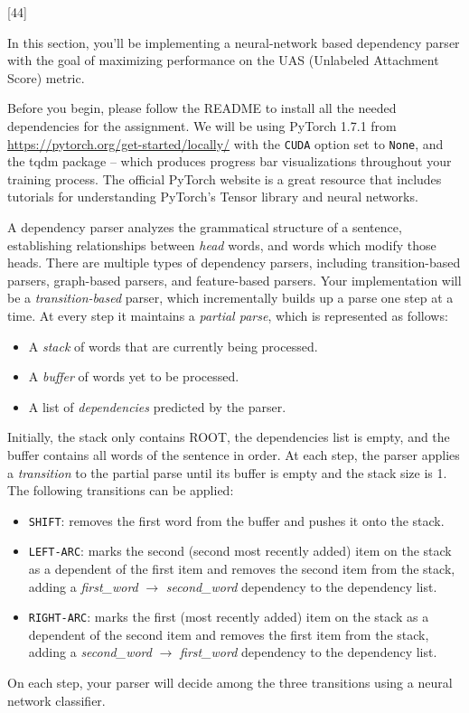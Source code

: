 [44]

In this section, you'll be implementing a neural-network based dependency parser with the goal of maximizing performance on the UAS (Unlabeled Attachment Score) metric.\newline

Before you begin, please follow the README to install all the needed dependencies for the assignment. We will be using PyTorch 1.7.1 from \url{https://pytorch.org/get-started/locally/} with the \texttt{CUDA} option set to \texttt{None}, and the tqdm package -- which produces progress bar visualizations throughout your training process. The official PyTorch website is a great resource that includes tutorials for understanding PyTorch's Tensor library and neural networks. \newline

A dependency parser analyzes the grammatical structure of a sentence, establishing relationships between \textit{head} words, and words which modify those heads. There are multiple types of dependency parsers, including transition-based parsers, graph-based parsers, and feature-based parsers. Your implementation will be a {\it transition-based} parser, which incrementally builds up a parse one step at a time. At every step it maintains a \textit{partial parse}, which is represented as follows:
\begin{itemize}
\item A {\it stack} of words that are currently being processed.
\item A {\it buffer} of words yet to be processed.
\item A list of {\it dependencies} predicted by the parser.
\end{itemize}
Initially, the stack only contains ROOT, the dependencies list is empty, and the buffer contains all words of the sentence in order. At each step, the parser applies a {\it transition} to the partial parse until its buffer is empty and the stack size is 1. The following transitions can be applied:
\begin{itemize}
\item \texttt{SHIFT}: removes the first word from the buffer and pushes it onto the stack.
\item \texttt{LEFT-ARC}: marks the second (second most recently added) item on the stack as a dependent of the first item and removes the second item from the stack, adding a \textit{first\_word} $\rightarrow$ \textit{second\_word} dependency to the dependency list.
\item \texttt{RIGHT-ARC}: marks the first (most recently added) item on the stack as a dependent of the second item and removes the first item from the stack, adding a \textit{second\_word} $\rightarrow$ \textit{first\_word} dependency to the dependency list.
\end{itemize}
On each step, your parser will decide among the three transitions using a neural network classifier.

